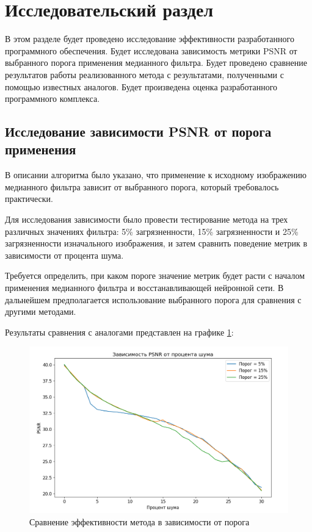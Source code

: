\section{Исследовательский раздел}
В этом разделе будет проведено исследование эффективности разработанного программного обеспечения.
Будет исследована зависимость метрики PSNR от выбранного порога применения медианного фильтра.
Будет проведено сравнение результатов работы реализованного метода с результатами, полученными с помощью известных аналогов.
Будет произведена оценка разработанного программного комплекса.

\subsection{Исследование зависимости PSNR от порога применения}
В описании алгоритма было указано, что применение к исходному изображению медианного фильтра зависит от выбранного порога, который требовалось практически.

Для исследования зависимости было провести тестирование метода на трех различных значениях фильтра: 5\% загрязненности, 15\% загрязненности и 25\% загрязненности изначального изображения, и затем сравнить поведение метрик в зависимости от процента шума.

Требуется определить, при каком пороге значение метрик будет расти с началом применения медианного фильтра и восстанавливающей нейронной сети.
В дальнейшем предполагается использование выбранного порога для сравнения с другими методами.

\newpage
Результаты сравнения с аналогами представлен на графике \ref{res::comp}:
\FloatBarrier
\begin{figure}[h]	
	\begin{center}
		\includegraphics[width=\linewidth]{inc/png/median1.png}
	\end{center}
	\captionsetup{justification=centering}
	\caption{Сравнение эффективности метода в зависимости от порога}
	\label{res::comp}
\end{figure}
\FloatBarrier

